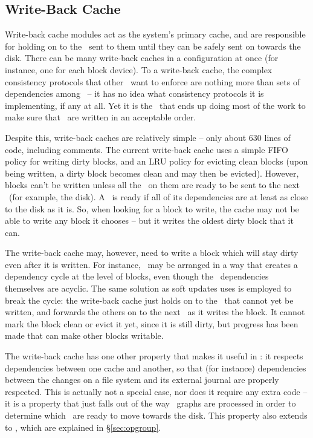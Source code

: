 \subsection{Write-Back Cache}
\label{sec:modules:wbcache}

Write-back cache modules act as the system's primary cache, and are
responsible for holding on to the \chdescs\ sent to them until they can be
safely sent on towards the disk.
%
%
There can be many write-back caches in a configuration at once (for
instance, one for each block device).
%
%
To a write-back cache, the complex consistency protocols that
other \modules\ want to enforce are nothing more than sets of dependencies among
\chdescs\ -- it has no idea what consistency protocols it is implementing, if
any at all.
%
Yet it is the \module\ that ends up doing most of the work to make
sure that \chdescs\ are written in an acceptable order.

Despite this, write-back caches are relatively simple -- only about 630 lines of
code, including comments. The current write-back cache uses a simple FIFO policy
for writing dirty blocks, and an LRU policy for evicting clean blocks (upon
being written, a dirty block becomes clean and may then be evicted). However,
blocks can't be written unless all the \chdescs\ on them are ready to be sent to
the next \module\ (for example, the disk). A \chdesc\ is ready if all of its
dependencies are at least as close to the disk as it is. So, when looking for a
block to write, the cache may not be able to write any block it chooses -- but
it writes the oldest dirty block that it can.

The write-back cache may, however, need to write a block which will stay dirty
even after it is written. For instance, \chdescs\ may be arranged in a way that
creates a dependency cycle at the level of blocks, even though the \chdesc\
dependencies themselves are acyclic. The same solution as soft updates uses is
employed to break the cycle: the write-back cache just holds on to the \chdescs\
that cannot yet be written, and forwards the others on to the next \module\ as
it writes the block. It cannot mark the block clean or evict it yet, since it is
still dirty, but progress has been made that can make other blocks writable.

The write-back cache has one other property that makes it useful in \Kudos: it
respects dependencies between one cache and another, so that (for instance)
dependencies between the changes on a file system and its external journal are
properly respected. This is actually not a special case, nor does it require any
extra code -- it is a property that just falls out of the way \chdesc\ graphs
are processed in order to determine which \chdescs\ are ready to move towards
the disk. This property also extends to \opgroups, which
are explained in \S\ref{sec:opgroup}.
